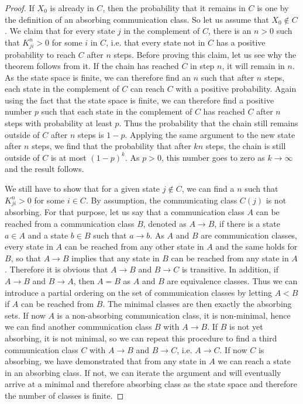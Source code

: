 \documentclass[a4paper, draft]{article}
\theoremstyle{own}
\theoremstyle{remark}
\begin{document}
\begin{proof}
	If $X_0$ is already in $C$, then the probability that it remains in $C$ is one by the definition of an absorbing communication class. So let us assume that $X_0 \notin C$. We claim that for every state $j$ in the complement of $C$, there is an $n > 0$ such that $K^n_{ji} > 0$ for some $i$ in $C$, i.e. that every state not in $C$ has a positive probability to reach $C$ after $n$ steps. 
	Before proving this claim, let us see why the theorem follows from it. If the chain has reached $C$ in step $n$, it will remain in $n$. As the state space is finite, we can therefore find an $n$ such that after $n$ steps, each state in the complement of $C$ can reach $C$ with a positive probability. Again using the fact that the state space is finite, we can therefore find a positive number $p$ such that each state in the complement of $C$ has reached $C$ after $n$ steps with probability at least $p$. Thus the probability that the chain still remains outside of $C$ after $n$ steps is $1 - p$. Applying the same argument to the new state after $n$ steps, we find that the probability that after $kn$ steps, the chain is still outside of $C$ is at most $(1-p)^k$. As $p > 0$, this number goes to zero as $k \rightarrow \infty$ and the result follows.
	
	We still have to show that for a given state $j \notin C$, we can find a $n$ such that $K^n_{ji} > 0$ for some $i \in C$. By assumption, the communicating class $C(j)$ is not absorbing. For that purpose, let us say that a communication class $A$ can be reached from a communication class $B$, denoted as $A \rightarrow B$, if there is a state $a \in A$ and a state $b \in B$ such that $a \rightarrow b$. As $A$ and $B$ are communication classes, every state in $A$ can be reached from any other state in $A$ and the same holds for $B$, so that $A \rightarrow B$ implies that any state in $B$ can be reached from any state in $A$. Therefore it is obvious that $A \rightarrow B$ and $B \rightarrow C$ is transitive. In addition, if $A \rightarrow B$ and $B \rightarrow A$, then $A = B$ as $A$ and $B$ are equivalence classes. Thus we can introduce a partial ordering on the set of communication classes by letting $A < B$ if $A$ can be reached from $B$. The minimal classes are then exactly the absorbing sets. If now $A$ is a non-absorbing communication class, it is non-minimal, hence we can find another communication class $B$ with $A \rightarrow B$. If $B$ is not yet absorbing, it is not minimal, so we can repeat this procedure to find a third communication class $C$ with $A \rightarrow B$ and $B \rightarrow C$, i.e. $A \rightarrow C$. If now $C$ is absorbing, we have demonstrated that from any state in $A$ we can reach a state in an absorbing class. If not, we can iterate the argument and will eventually arrive at a minimal and therefore absorbing class as the state space and therefore the number of classes is finite.
\end{proof}
\end{document}
